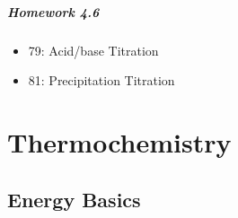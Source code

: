 \documentclass[12pt, openany, letterpaper]{memoir}
\begin{document}
\paragraph*{Homework 4.6}
\begin{itemize}
  \item 79: Acid/base Titration
  \item 81: Precipitation Titration
\end{itemize}

\chapter{Thermochemistry}

\section{Energy Basics}
\end{document}
